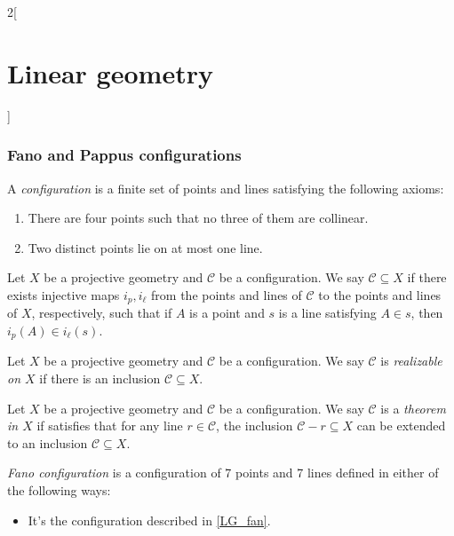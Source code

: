 \documentclass[../../../main.tex]{subfiles}
\begin{document}
\begin{multicols}{2}[\section{Linear geometry}]
  \subsubsection{Fano and Pappus configurations}
  \begin{definition}
    A \textit{configuration} is a finite set of points and lines satisfying the following axioms:
    \begin{enumerate}
      \item There are four points such that no three of them are collinear.
      \item Two distinct points lie on at most one line.
    \end{enumerate}
  \end{definition}
  \begin{definition}
    Let $X$ be a projective geometry and $\mathcal{C}$ be a configuration. We say $\mathcal{C}\subseteq X$ if there exists injective maps $i_p,i_\ell$ from the points and lines of $\mathcal{C}$ to the points and lines of $X$, respectively, such that if $A$ is a point and $s$ is a line satisfying $A\in s$, then $i_p(A)\in i_\ell(s)$.
  \end{definition}
  \begin{definition}
    Let $X$ be a projective geometry and $\mathcal{C}$ be a configuration. We say $\mathcal{C}$ is \textit{realizable on $X$} if there is an inclusion $\mathcal{C}\subseteq X$.
  \end{definition}
  \begin{definition}
    Let $X$ be a projective geometry and $\mathcal{C}$ be a configuration. We say $\mathcal{C}$ is a \textit{theorem in $X$} if satisfies that for any line $r\in\mathcal{C}$, the inclusion $\mathcal{C}-r\subseteq X$ can be extended to an inclusion $\mathcal{C}\subseteq X$.
  \end{definition}
  \begin{definition}
    \textit{Fano configuration} is a configuration of 7 points and 7 lines defined in either of the following ways:
    \begin{itemize}
      \item It's the configuration described in \cref{LG_fan}.
            \begin{center}
              \begin{minipage}{\linewidth}
                \centering
                
                \label{LG_fan}
              \end{minipage}

\end{center}
\end{itemize}
\end{definition}
\end{multicols}
\end{document}
